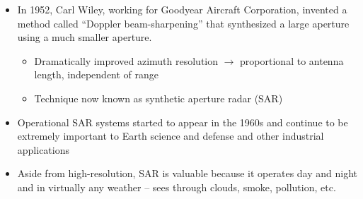 \documentclass[11pt, oneside]{article}
\begin{document}
\begin{itemize}
\begin{itemize}
		\item[--] Main disadvantage to this approach is the poor azimuth resolution (as we shall see)
		\item[--] Az.\ resolution inversely proportional length of antenna (and proportional to distance to target), ``good'' resolution ($<$100s of meters) required huge antenna, too large to fly on aircraft or spacecraft
	\end{itemize}
	\item In 1952, Carl Wiley, working for Goodyear Aircraft Corporation, invented a method called ``Doppler beam-sharpening'' that synthesized a large aperture using a much smaller aperture.
	\begin{itemize}
		\item[--] Dramatically improved azimuth resolution $\rightarrow$ proportional to antenna length, independent of range
		\item[--] Technique now known as synthetic aperture radar (SAR)
	\end{itemize}
	\item Operational SAR systems started to appear in the 1960s and continue to be extremely important to Earth science and defense and other industrial applications
	\item Aside from high-resolution, SAR is valuable because it operates day and night and in virtually any weather -- sees through clouds, smoke, pollution, etc.
\end{itemize}
\end{document}
